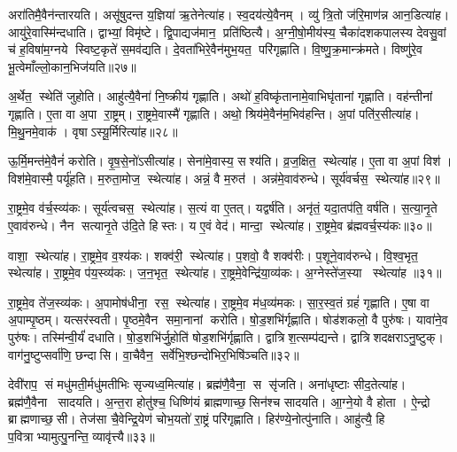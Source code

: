 अरा॑तिमै॒वैन॑न्तारयति।
असू॑षुदन्त य॒ज्ञिया॑ ऋ॒तेनेत्या॑ह।
स्व॒दय॑त्ये॒वैनम्।
व्यु॑ त्रि॒तो ज॑रि॒माण॑न्न आन॒डित्या॑ह।
आयु॑रे॒वास्मि॑न्दधाति।
द्वाभ्यां॒ विमृ॑ष्टे।
द्वि॒पाद्यज॑मान॒ प्रति॑ष्ठित्यै।
अ॒ग्नी॒षो॒मीय॑स्य॒ चैका॑दशकपालस्य देवसु॒वां च॑ ह॒विषा॑म॒ग्नये स्विष्ट॒कृते॑ स॒मव॑द्यति।
दे॒वता॑भिरे॒वैन॑मुभ॒यत॒ परि॑गृह्णाति।
वि॒ष्णु॒क्र॒मान्क्र॑मते।
विष्णु॑रे॒व भू॒त्वेमाँल्लो॒कान॒भि\-ज॑यति॥२७॥\anuvakamend[स॒त्याना॑मधा॒यीत्या॑हातारी॒दित्या॑ह क्रमत॒ एकं च]

अ॒र्थेत॒ स्थेति॑ जुहोति।
आहु॑त्यै॒वैना॑ नि॒ष्क्रीय॑ गृह्णाति।
अथो॑ ह॒विष्कृ॑तानामे॒वाभिघृ॑तानां गृह्णाति।
वह॑न्तीनां गृह्णाति।
ए॒ता वा अ॒पा रा॒ष्ट्रम्।
रा॒ष्ट्रमे॒वास्मै॑ गृह्णाति।
अथो॒ श्रिय॑मे॒वैन॑म॒भिव॑हन्ति।
अ॒पां पति॑र॒सीत्या॑ह।
मि॒थु॒नमे॒वाक॑।
वृषाऽस्यू॒र्मिरित्या॑ह॥२८॥

ऊ॒र्मि॒मन्त॑मे॒वैनं॑ करोति।
वृ॒ष॒से॒नो॑ऽसीत्या॑ह।
सेना॑मे॒वास्य॒ सश्य॑ति।
व्र॒ज॒क्षित॒ स्थेत्या॑ह।
ए॒ता वा अ॒पां विश॑।
विश॑मे॒वास्मै॒ पर्यू॑हति।
म॒रुता॒मोज॒ स्थेत्या॑ह।
अन्नं॒ वै म॒रुत॑।
अन्न॑मे॒वाव॑रुन्धे।
सूर्य॑वर्चस॒ स्थेत्या॑ह॥२९॥

रा॒ष्ट्रमे॒व व॑र्च॒स्व्य॑कः।
सूर्य॑त्वचस॒ स्थेत्या॑ह।
स॒त्यं वा ए॒तत्।
यद्वर्\mbox{}ष॑ति।
अनृ॑तं॒ यदा॒तप॑ति॒ वर्\mbox{}ष॑ति।
स॒त्या॒नृ॒ते ए॒वाव॑रुन्धे।
नैन सत्यानृ॒ते उ॑दि॒ते हिस्तः।
य ए॒वं वेद॑।
मान्दा॒ स्थेत्या॑ह।
रा॒ष्ट्रमे॒व ब्र॑ह्मवर्च॒स्य॑कः॥३०॥

वाशा॒ स्थेत्या॑ह।
रा॒ष्ट्रमे॒व व॒श्य॑कः।
शक्व॑री॒ स्थेत्या॑ह।
प॒शवो॒ वै शक्व॑रीः।
प॒शूने॒वाव॑रुन्धे।
वि॒श्व॒भृत॒ स्थेत्या॑ह।
रा॒ष्ट्रमे॒व प॑य॒स्व्य॑कः।
ज॒न॒भृत॒ स्थेत्या॑ह।
रा॒ष्ट्रमे॒वेन्द्रि॑या॒व्य॑कः।
अ॒ग्नेस्ते॑ज॒स्या स्थेत्या॑ह ॥३१॥

रा॒ष्ट्रमे॒व ते॑ज॒स्व्य॑कः।
अ॒पामोष॑धीना॒ रस॒ स्थेत्या॑ह।
रा॒ष्ट्रमे॒व म॑ध॒व्य॑मकः।
सा॒र॒स्व॒तं ग्रहं॑ गृह्णाति।
ए॒षा वा अ॒पाम्पृ॒ष्ठम्।
यत्सर॑स्वती।
पृ॒ष्ठमे॒वैन समा॒नानां करोति।
षो॒ड॒शभि॑र्गृह्णाति।
षोड॑शकलो॒ वै पुरु॑षः।
यावा॑ने॒व पुरु॑षः।
तस्मि॑न्वी॒र्यं॑ दधाति।
षो॒ड॒शभि॑र्जु॒होति॑ षोड॒शभि॑र्गृह्णाति।
द्वात्रिश॒त्सम्प॑द्यन्ते।
द्वात्रिशदक्षराऽनु॒ष्टुक्।
वाग॑नु॒ष्टुप्सर्वा॑णि॒ छन्दासि।
वा॒चैवैन॒ सर्वे॑भि॒श्छन्दो॑भिर॒भिषि॑ञ्चति॥३२॥\anuvakamend[ऊ॒र्मिरित्या॑ह॒ सूर्य॑वर्चस॒ स्थेत्या॑ह ब्रह्मवर्च॒स्य॑कस्तेज॒स्या स्थेत्या॑है॒व पुरु॑ष॒ष्षट् च॑]

देवी॑राप॒ सं मधु॑मती॒र्मधु॑मतीभिः सृज्यध्व॒मित्या॑ह।
ब्रह्म॑णै॒वैना॒ स सृ॑जति।
अना॑धृष्टाः सीद॒तेत्या॑ह।
ब्रह्म॑णै॒वैना सादयति।
अ॒न्त॒रा होतु॑श्च॒ धिष्णि॑यं ब्राह्मणाच्छ॒सिन॑श्च सादयति।
आ॒ग्ने॒यो वै होता।
ऐ॒न्द्रो ब्राह्मणाच्छ॒सी।
तेज॑सा चै॒वेन्द्रि॒येण॑ चोभ॒यतो॑ रा॒ष्ट्रं परि॑गृह्णाति।
हिर॑ण्ये॒नोत्पु॑नाति।
आहु॑त्यै॒ हि प॒वित्राभ्यामुत्पु॒नन्ति॒ व्यावृ॑त्त्यै॥३३॥

